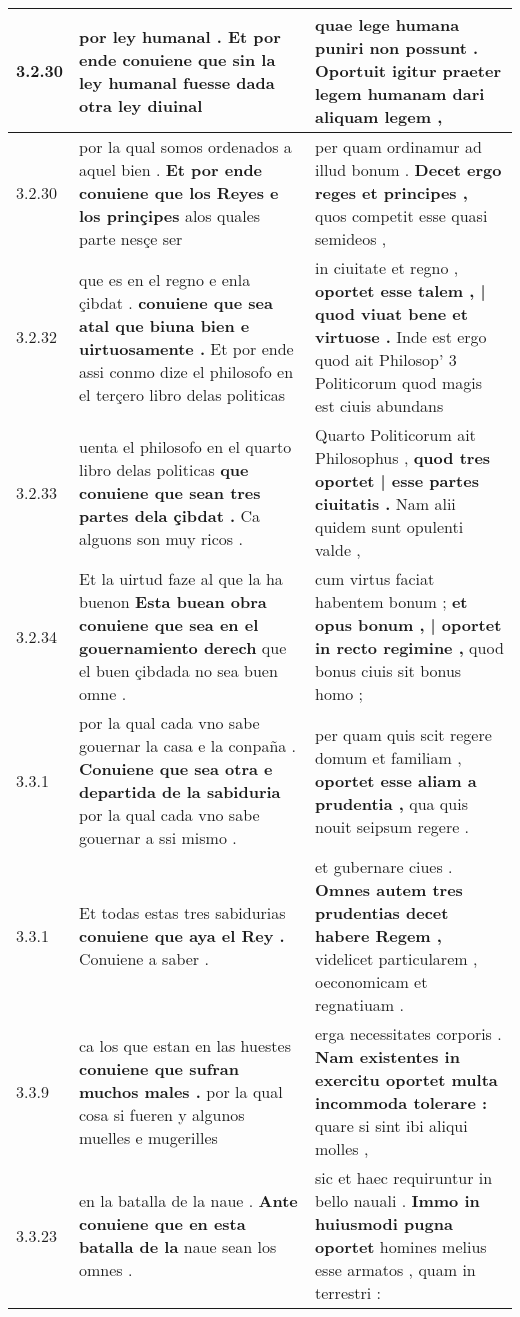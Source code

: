 \begin{tabular}{|p{1cm}|p{6.5cm}|p{6.5cm}|}
3.2.30 & por ley humanal . \textbf{ Et por ende conuiene que sin la ley humanal fuesse } dada otra ley diuinal & quae lege humana puniri non possunt . \textbf{ Oportuit igitur praeter legem humanam } dari aliquam legem , \\\hline
3.2.30 & por la qual somos ordenados a aquel bien . \textbf{ Et por ende conuiene que los Reyes e los prinçipes } alos quales parte nesçe ser & per quam ordinamur ad illud bonum . \textbf{ Decet ergo reges et principes , } quos competit esse quasi semideos , \\\hline
3.2.32 & que es en el regno e enla çibdat . \textbf{ conuiene que sea atal que biuna bien e uirtuosamente . } Et por ende assi conmo dize el philosofo en el terçero libro delas politicas & in ciuitate et regno , \textbf{ oportet esse talem , | quod viuat bene et virtuose . } Inde est ergo quod ait Philosop’ 3 Politicorum quod magis est ciuis abundans \\\hline
3.2.33 & uenta el philosofo en el quarto libro delas politicas \textbf{ que conuiene que sean tres partes dela çibdat . } Ca alguons son muy ricos . & Quarto Politicorum ait Philosophus , \textbf{ quod tres oportet | esse partes ciuitatis . } Nam alii quidem sunt opulenti valde , \\\hline
3.2.34 & Et la uirtud faze al que la ha buenon \textbf{ Esta buean obra conuiene que sea en el gouernamiento derech } que el buen çibdada no sea buen omne . & cum virtus faciat habentem bonum ; \textbf{ et opus bonum , | oportet in recto regimine , } quod bonus ciuis sit bonus homo ; \\\hline
3.3.1 & por la qual cada vno sabe gouernar la casa e la conpaña . \textbf{ Conuiene que sea otra e departida de la sabiduria } por la qual cada vno sabe gouernar a ssi mismo . & per quam quis scit regere domum et familiam , \textbf{ oportet esse aliam a prudentia , } qua quis nouit seipsum regere . \\\hline
3.3.1 & Et todas estas tres sabidurias \textbf{ conuiene que aya el Rey . } Conuiene a saber . & et gubernare ciues . \textbf{ Omnes autem tres prudentias decet habere Regem , } videlicet particularem , oeconomicam et regnatiuam . \\\hline
3.3.9 & ca los que estan en las huestes \textbf{ conuiene que sufran muchos males . } por la qual cosa si fueren y algunos muelles e mugerilles & erga necessitates corporis . \textbf{ Nam existentes in exercitu oportet multa incommoda tolerare : } quare si sint ibi aliqui molles , \\\hline
3.3.23 & en la batalla de la naue . \textbf{ Ante conuiene que en esta batalla de la } naue sean los omnes . & sic et haec requiruntur in bello nauali . \textbf{ Immo in huiusmodi pugna oportet } homines melius esse armatos , quam in terrestri : \\\hline

\end{tabular}
